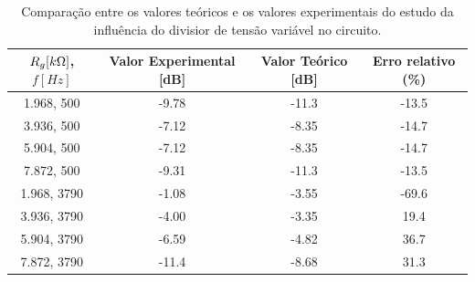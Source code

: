 \begin{table}[ht]
    \centering
    \caption{Comparação entre os valores teóricos e os valores experimentais do estudo da influência do divisior de tensão variável no circuito.}
    \begin{tabular}{cccc}
    \hline
         $R_g [k\ohm]$, $f[Hz]$ & Valor Experimental [dB] & Valor Teórico [dB]  & Erro relativo (\%)\\
        \hline
       1.968, 500 & -9.78 & -11.3 & -13.5 \\
        3.936,  500 & -7.12 & -8.35 & -14.7 \\
        5.904,  500 & -7.12 & -8.35 & -14.7 \\
        7.872,  500 & -9.31 & -11.3 & -13.5 \\
        1.968,  3790 & -1.08 & -3.55 &-69.6  \\
        3.936, 3790 & -4.00 & -3.35 & 19.4 \\
        5.904, 3790 & -6.59 & -4.82 & 36.7 \\
         7.872, 3790 & -11.4 & -8.68 & 31.3 \\
    \hline
    \end{tabular}
    \label{tab:erros_pot}
\end{table}
